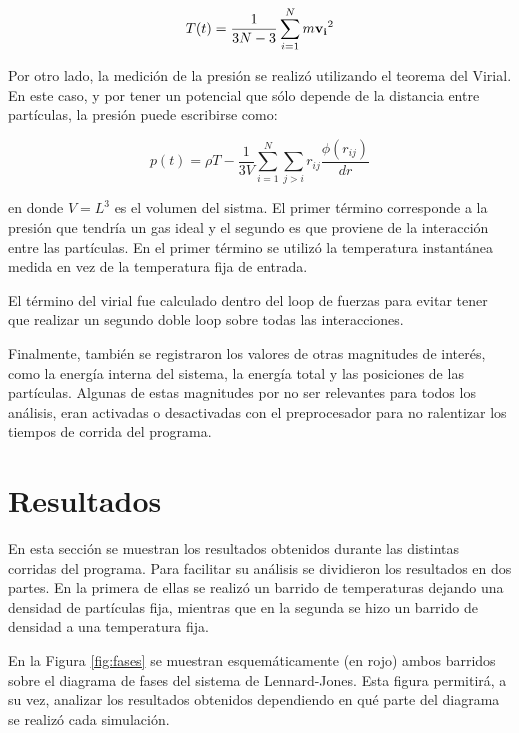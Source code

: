 \documentclass[a4paper,12pt]{article}
\begin{document}
\begin{equation}\label{eq:tempe}
 T(t) = \frac{1}{3N-3} \sum_{i=1}^{N} m {\bf v_i}^2
\end{equation}

Por otro lado, la medición de la presión se realizó utilizando el teorema del 
Virial. En este caso, y por tener un potencial que sólo depende de la distancia 
entre partículas, la presión puede escribirse como:

\begin{equation}\label{eq:pres}
p(t) = \rho T  - \frac{1}{3V} \sum_{i=1}^N \sum_{j>i} r_{ij} \frac{\phi(r_{ij})}{dr}
\end{equation}

\noindent en donde $V=L^3$ es el volumen del sistma. El primer término 
corresponde a la presión que tendría un gas ideal y el segundo es que proviene 
de la interacción entre las partículas. En el primer término se utilizó la 
temperatura instantánea medida en vez de la temperatura fija de entrada.

El término del virial fue calculado dentro del loop de fuerzas para evitar 
tener que realizar un segundo doble loop sobre todas las interacciones.

Finalmente, también se registraron los valores de otras magnitudes de interés, 
como la energía interna del sistema, la energía total y las posiciones de las 
partículas. Algunas de estas magnitudes por no ser relevantes para todos los 
análisis, eran activadas o desactivadas con el preprocesador para no ralentizar 
los tiempos de corrida del programa.

\section{Resultados}

En esta sección se muestran los resultados obtenidos durante las distintas 
corridas del programa. Para facilitar su análisis se dividieron los resultados 
en dos partes. En la primera de ellas se realizó un barrido de temperaturas 
dejando una densidad de partículas fija, mientras que en la segunda se hizo un 
barrido de densidad a una temperatura fija.

En la Figura \eqref{fig:fases} se muestran esquemáticamente (en rojo) ambos 
barridos sobre el diagrama de fases del sistema de Lennard-Jones. Esta figura 
permitirá, a su vez, analizar los resultados obtenidos dependiendo en qué parte 
del diagrama se realizó cada simulación.
\end{document}
